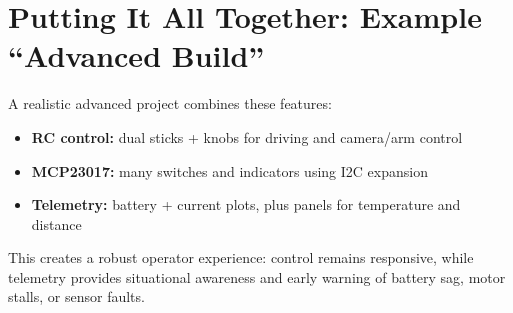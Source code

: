\section{Putting It All Together: Example ``Advanced Build''}
\label{sec:advanced-build-example}

A realistic advanced project combines these features:

\begin{itemize}
    \item \textbf{RC control:} dual sticks + knobs for driving and camera/arm control
    \item \textbf{MCP23017:} many switches and indicators using I2C expansion
    \item \textbf{Telemetry:} battery + current plots, plus panels for temperature and distance
\end{itemize}

This creates a robust operator experience: control remains responsive, while telemetry provides
situational awareness and early warning of battery sag, motor stalls, or sensor faults.